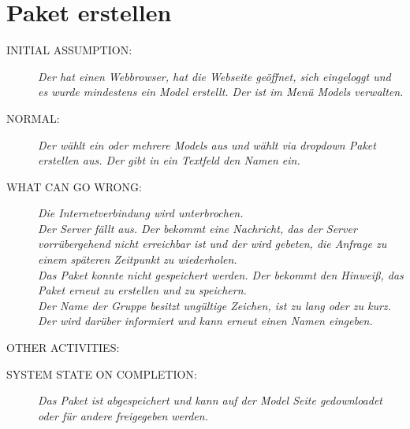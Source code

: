 \section{Paket erstellen}
\begin{description}
  \item [INITIAL ASSUMPTION:]
    \textit{Der  hat einen Webbrowser, hat die Webseite geöffnet, sich eingeloggt und es wurde mindestens ein \gls{Model} erstellt. Der  ist im Menü \glspl{Model} verwalten.}
  \item [NORMAL:]
    \textit{Der  wählt ein oder mehrere \glspl{Model} aus und wählt via \gls{dropdown} \gls{Paket} erstellen aus. Der  gibt in ein Textfeld den Namen ein. } 
  \item [WHAT CAN GO WRONG:]
    \textit{Die Internetverbindung wird unterbrochen.\\
Der Server fällt aus. Der  bekommt eine Nachricht, das der Server vorrübergehend nicht erreichbar ist und der  wird gebeten, die Anfrage zu einem späteren Zeitpunkt zu wiederholen.\\
Das \gls{Paket} konnte nicht gespeichert werden. Der  bekommt den Hinweiß, das \gls{Paket} erneut zu erstellen und zu speichern.\\
Der Name der \gls{Gruppe} besitzt ungültige Zeichen, ist zu lang oder zu kurz. Der  wird darüber informiert und kann erneut einen Namen eingeben.}
  \item [OTHER ACTIVITIES:]
    \textit{}
  \item [SYSTEM STATE ON COMPLETION:]
    \textit{Das \gls{Paket} ist abgespeichert und kann auf der \gls{Model} Seite gedownloadet oder für andere  freigegeben werden.}
\end{description}

